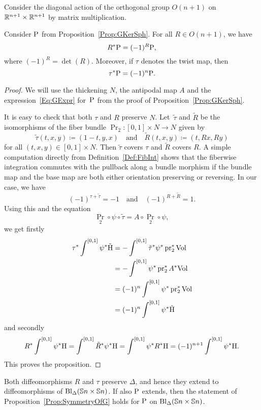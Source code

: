 \documentclass[\MainFolder/Text.tex]{subfiles}
\begin{document}
Consider the diagonal action of the orthogonal group $O(n+1)$ on $\mathbb{R}^{n+1}\times\mathbb{R}^{n+1}$ by matrix multiplication.
\begin{Proposition}\label{Prop:SymmetryOfG}
Consider $\mathrm{P}$ from Proposition~\ref{Prop:GKerSph}. For all $R\in O(n+1)$, we have
$$ R^* \mathrm{P} = (-1)^R \mathrm{P}, $$
where $(-1)^R = \det(R)$. Moreover, if $\tau$ denotes the twist map, then
$$\tau^*\mathrm{P} = (-1)^{n}\mathrm{P}. $$ 
\end{Proposition}
%
\begin{proof} %
We will use the thickening $N$, the antipodal map $A$ and the expression~\eqref{Eq:GExpr} for~$\mathrm{P}$ from the proof of Proposition~\ref{Prop:GKerSph}.

It is easy to check that both $\tau$ and $R$ preserve $N$. Let~$\tilde{\tau}$ and $\tilde{R}$ be the isomorphisms of the fiber bundle $\Pr_2: [0,1]\times N \rightarrow N$ given by 
$$ \tilde{\tau}(t,x,y) \coloneqq (1-t,y,x)\quad \text{and}\quad \tilde{R}(t,x,y) \coloneqq (t,Rx,Ry) $$
for all $(t,x,y)\in [0,1]\times N$. Then $\tilde{\tau}$ covers $\tau$ and $\tilde{R}$ covers $R$. A simple computation directly from Definition~\ref{Def:FibInt} shows that the fiberwise integration commutes with the pullback along a bundle morphism if the bundle map and the base map are both either orientation preserving or reversing. In our case, we have 
$$ (-1)^{\tau + \tilde{\tau}} = -1\quad \text{and}\quad (-1)^{R+\tilde{R}} = 1. $$
Using this and the equation
$$ \Pr_2 \circ \psi \circ \tilde{\tau} = A\circ \Pr_2 \circ \psi, $$
we get firstly
\allowdisplaybreaks
\begin{align*}
\tau^* \int^{[0,1]} \psi^*\tilde{\mathrm{H}} &=  - \int^{[0,1]} \tilde{\tau}^* \psi^*\operatorname{\mathrm{pr}}_2^*\mathrm{Vol} \\ &= - \int^{[0,1]} \psi^*\operatorname{\mathrm{pr}}_2^*A^* \mathrm{Vol} \\ &= (-1)^n \int^{[0,1]} \psi^*\operatorname{\mathrm{pr}}_2^*\mathrm{Vol} \\ & = (-1)^n \int^{[0,1]} \psi^*\tilde{\mathrm{H}}
\end{align*}
and secondly
$$ R^* \int^{[0,1]} \psi^* \mathrm{H} = \int^{[0,1]} \tilde{R}^* \psi^* \mathrm{H} = \int^{[0,1]} \psi^* R^*\mathrm{H} = (-1)^{n+1} \int^{[0,1]} \psi^* \mathrm{H}. $$
This proves the proposition.
\end{proof}
Both diffeomorphisms $R$ and $\tau$ preserve $\Delta$, and hence they extend to diffeomorphisms of $\mathrm{Bl}_\Delta(\mathbb{S}{n}\times\mathbb{S}{n})$. If also $\mathrm{P}$ extends, then the statement of Proposition~\ref{Prop:SymmetryOfG} holds for $\mathrm{P}$ on $\mathrm{Bl}_\Delta(\mathbb{S}{n}\times\mathbb{S}{n})$.
\end{document}
